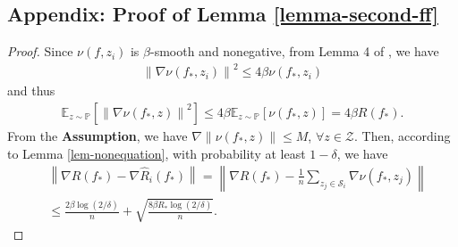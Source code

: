 \documentclass{article}
\begin{document}
\subsection{Appendix: Proof of Lemma \ref{lemma-second-ff}}
\begin{proof}
  Since $\nu(f,z_i)$ is $\beta$-smooth and nonegative,
  from Lemma 4 of \cite{srebro2010optimistic}, we have
  \begin{align*}
    \left\|\nabla \nu(f_\ast,z_i)\right\|^2\leq 4\beta \nu(f_\ast,z_i)
  \end{align*}
  and thus
    \begin{align*}
      \mathbb{E}_{z\sim\mathbb{P}}\left[\left\|\nabla \nu(f_\ast,z)\right\|^2\right]\leq 4\beta\mathbb{E}_{z\sim\mathbb{P}}[\nu(f_\ast,z)]=
      4\beta R(f_\ast).
    \end{align*}
    From the \textbf{Assumption}, we have $\nabla \|\nu(f_\ast, z)\|\leq M$, $\forall z\in\mathcal{Z}$.
    Then, according to Lemma \ref{lem-nonequation}, with probability at least $1-\delta$, we have
    \begin{align*}
      &\left\|\nabla R(f_\ast)-\nabla \hat{R}_i(f_\ast)\right\|=\left\|\nabla R(f_\ast)-\frac{1}{n}\sum_{z_j\in\mathcal{S}_i}\nabla \nu(f_\ast,z_j)\right\|\\
      &\leq \frac{2\beta \log(2/\delta)}{n}+\sqrt{\frac{8\beta R_\ast \log(2/\delta)}{n}}.
    \end{align*}
\end{proof}


\end{document}
